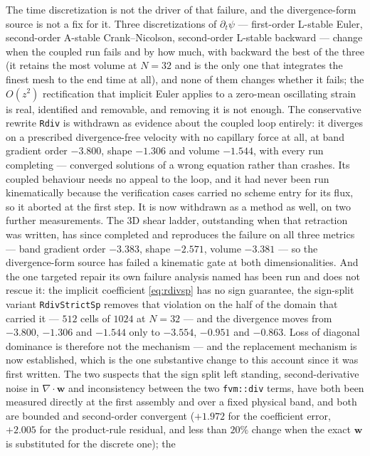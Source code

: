 \documentclass[preprint,3p,11pt]{elsarticle}
\newcommand{\psilev}{\psi}
\begin{document}
The time discretization is not the driver of that failure, and the divergence-form
source is not a fix for it. Three discretizations of $\partial_t\psilev$ ---
first-order L-stable Euler, second-order A-stable Crank--Nicolson, second-order
L-stable backward --- change when the coupled run fails and by how much, with
backward the best of the three (it retains the most volume at $N=32$ and is the
only one that integrates the finest mesh to the end time at all), and none of
them changes whether it fails; the $O(z^2)$ rectification that implicit Euler applies
to a zero-mean oscillating strain is real, identified and removable, and removing
it is not enough. The conservative rewrite \texttt{Rdiv} is withdrawn as evidence
about the coupled loop entirely: it diverges on a prescribed divergence-free
velocity with no capillary force at all, at band gradient order $-3.800$, shape
$-1.306$ and volume $-1.544$, with every run completing --- converged solutions of
a wrong equation rather than crashes. Its coupled behaviour needs no appeal to
the loop, and it had never been run kinematically because the verification cases
carried no scheme entry for its flux, so it aborted at the first step. It is now
withdrawn as a method as well, on two further measurements. The 3D shear ladder,
outstanding when that retraction was written, has since completed and reproduces
the failure on all three metrics --- band gradient order $-3.383$, shape $-2.571$,
volume $-3.381$ --- so the divergence-form source has failed a kinematic gate at
both dimensionalities. And the one targeted repair its own failure analysis named
has been run and does not rescue it: the implicit coefficient \eqref{eq:rdivsp}
has no sign guarantee, the sign-split variant \texttt{RdivStrictSp} removes that
violation on the half of the domain that carried it --- $512$ cells of $1024$ at
$N=32$ --- and the divergence moves from $-3.800$, $-1.306$ and $-1.544$ only to
$-3.554$, $-0.951$ and $-0.863$. Loss of diagonal dominance is therefore not the
mechanism --- and the replacement mechanism is now established, which is the one
substantive change to this account since it was first written. The two suspects
that the sign split left standing, second-derivative noise in
$\nabla\cdot\mathbf{w}$ and inconsistency between the two \texttt{fvm::div} terms,
have both been measured directly at the first assembly and over a fixed physical
band, and both are bounded and second-order convergent ($+1.972$ for the
coefficient error, $+2.005$ for the product-rule residual, and less than $20\%$
change when the exact $\mathbf{w}$ is substituted for the discrete one); the
\end{document}
